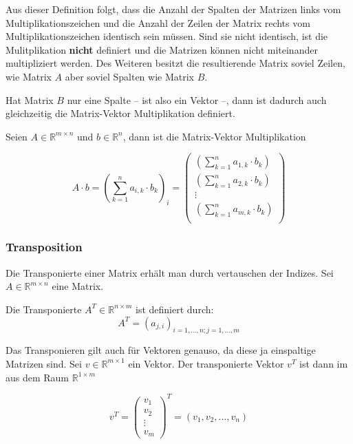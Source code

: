 Aus dieser Definition folgt, dass die Anzahl der Spalten der Matrizen links vom Multiplikationszeichen und die Anzahl der Zeilen der Matrix rechts vom Multiplikationszeichen identisch sein müssen. Sind sie nicht identisch, ist die Mulitplikation \textbf{nicht} definiert und die Matrizen können nicht miteinander multipliziert werden. Des Weiteren besitzt die resultierende Matrix soviel Zeilen, wie Matrix $A$ aber soviel Spalten wie Matrix $B$.

\begin{svgraybox}
Hat Matrix $B$ nur eine Spalte -- ist also ein Vektor --, dann ist dadurch auch gleichzeitig die Matrix-Vektor Multiplikation definiert. 
\end{svgraybox}

Seien $A\in \mathbb{R}^{m\times n}$ und $b\in \mathbb{R}^n$, dann ist die Matrix-Vektor Multiplikation

\begin{equation*}
A \cdot b = \left( \sum_{k=1}^{n} a_{i,k} \cdot b_{k} \right)_{i} = \begin{pmatrix}
\left( \sum_{k=1}^{n} a_{1,k} \cdot b_{k} \right) \\
\left( \sum_{k=1}^{n} a_{2,k} \cdot b_{k} \right) \\
\vdots \\
\left( \sum_{k=1}^{n} a_{m,k} \cdot b_{k} \right) \\
\end{pmatrix}
\end{equation*}

\subsubsection{Transposition}

Die Transponierte einer Matrix erhält man durch vertauschen der Indizes. Sei $A \in \mathbb{R}^{m\times n} $ eine Matrix. 

\begin{definition}
Die Transponierte $A^T \in \mathbb{R}^{n\times m}$ ist definiert durch:
\[
	A^T = (a_{j,i})_{i=1,\dots, n; j=1,\dots, m}
\]
\end{definition}
Das Transponieren gilt auch für Vektoren genauso, da diese ja einspaltige Matrizen sind. Sei $v\in \mathbb{R}^{m\times 1}$ ein Vektor. Der transponierte Vektor $v^T$ ist dann im aus dem Raum $\mathbb{R}^{1\times m}$

\[
v^T = \begin{pmatrix}
v_1\\
v_2\\
\vdots \\
v_m
\end{pmatrix}^T = (v_1, v_2, \dots , v_n)
\]

